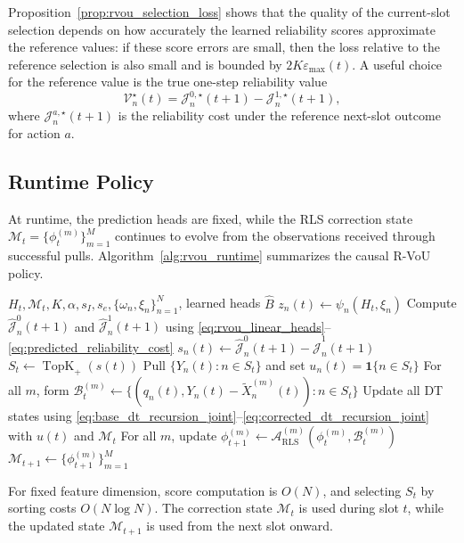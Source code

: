 \documentclass[conference]{IEEEtran}
\begin{document}
Proposition~\ref{prop:rvou_selection_loss} shows that the quality of the
current-slot selection depends on how accurately the learned reliability scores
approximate the reference values: if these score errors are small, then the
loss relative to the reference selection is also small and is bounded by
\(2K\varepsilon_{\max}(t)\).
A useful choice for the reference value is the true one-step reliability value
\vspace{-0.1mm}
\begin{equation}
\label{eq:true_reference_value}
\mathcal V_n^\star(t)
=
\mathcal J_n^{0,\star}(t+1)
-
\mathcal J_n^{1,\star}(t+1),
\end{equation}
where \(\mathcal J_n^{a,\star}(t+1)\) is the reliability cost under the
reference next-slot outcome for action \(a\).
\vspace{-1.80mm}
\subsection{Runtime Policy}
\vspace{-1mm}
At runtime, the prediction heads are fixed, while the RLS correction state
\(\mathcal M_t=\{\phi_t^{(m)}\}_{m=1}^{M}\) continues to evolve from the
observations received through successful pulls.
Algorithm~\ref{alg:rvou_runtime} summarizes the causal R-VoU policy.

\begin{algorithm}[t]
\caption{Runtime R-VoU at Slot \(t\)}
\label{alg:rvou_runtime}
\small
\begin{algorithmic}[1]

\Require \(H_t,\mathcal M_t,K,\alpha,s_I,s_e,
\{\omega_n,\xi_n\}_{n=1}^{N}\), learned heads \(\widehat B\)
    \State \(z_n(t)\gets\psi_n(H_t,\xi_n)\)
    \State Compute \(\widehat{\mathcal J}_n^0(t+1)\) and
    \(\widehat{\mathcal J}_n^1(t+1)\) using
    \eqref{eq:rvou_linear_heads}--\eqref{eq:predicted_reliability_cost}
    \State \(s_n(t)
    \gets
    \widehat{\mathcal J}_n^0(t+1)
    -
    \widehat{\mathcal J}_n^1(t+1)\)
\EndFor
\State \(S_t\gets\operatorname{TopK}_{+}(s(t))\)
\State Pull \(\{Y_n(t):n\in S_t\}\) and set
\(u_n(t)=\mathbf 1\{n\in S_t\}\)
\State For all \(m\), form
\(\mathcal B_t^{(m)}
\gets\{(q_n(t),Y_n(t)-\tilde X_n^{(m)}(t)):n\in S_t\}\)
\State Update all DT states using
\eqref{eq:base_dt_recursion_joint}--\eqref{eq:corrected_dt_recursion_joint}
with \(u(t)\) and \(\mathcal M_t\)
\State For all \(m\), update
\(\phi_{t+1}^{(m)}
\gets \mathcal A_{\mathrm{RLS}}^{(m)}
(\phi_t^{(m)},\mathcal B_t^{(m)})\)
\State \(\mathcal M_{t+1}\gets\{\phi_{t+1}^{(m)}\}_{m=1}^{M}\)
\end{algorithmic}
\end{algorithm}
\vspace{-0.3mm}
For fixed feature dimension, score computation is \(O(N)\), and selecting
\(S_t\) by sorting costs \(O(N\log N)\). The correction state
\(\mathcal M_t\) is used during slot \(t\), while the updated state
\(\mathcal M_{t+1}\) is used from the next slot onward.
\vspace{-2.45mm}
\end{document}
